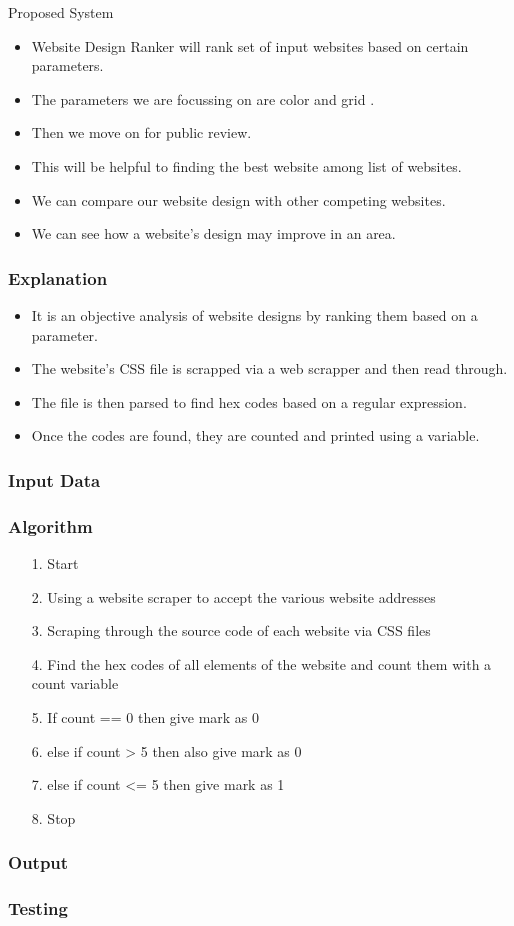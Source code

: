 \documentclass[11pt]{beamer}
\begin{document}
	\begin{frame}{Proposed System}
\begin{itemize}
	\item Website Design Ranker will rank set of input websites based on certain parameters.
	\item The parameters we are focussing on are color and grid .
	\item Then we move on for public review.
	\item This will be helpful to finding the best website among list of websites.
	\item We can compare our website design with other competing websites.
	\item We can see how a website's design may improve in an area.
	
\end{itemize}
\end{frame}
\begin{frame}
\frametitle{Explanation}
\begin{itemize}
	\item It is an objective analysis of website designs by ranking them based on a parameter.
	\item The website's CSS file is scrapped via a web scrapper and then read through.
	\item The file is then parsed to find hex codes based on a regular expression.
	\item Once the codes are found, they are counted and printed using a variable.
\end{itemize}
\end{frame}
\begin{frame}
\frametitle{Input Data}
\end{frame}
	\begin{frame}
	\frametitle{{Algorithm}}
	\begin{enumerate}
		\item[1.] Start
		\item[2.] Using a website scraper to accept the various website addresses
		\item[3.] Scraping through the source code of each website via CSS files
		\item[4.] Find the hex codes of all elements of the website and count them with a count variable
		\item[5.] If count == 0 then give mark as 0
		\item[6.] else if count > 5 then also give mark as 0
		\item[7.] else if count <= 5 then give mark as 1
		\item[8.] Stop
	\end{enumerate}
	
	\end{frame}
\begin{frame}
\frametitle{Output}
\end{frame}
\begin{frame}
\frametitle{Testing}
\end{frame}
\end{document}
